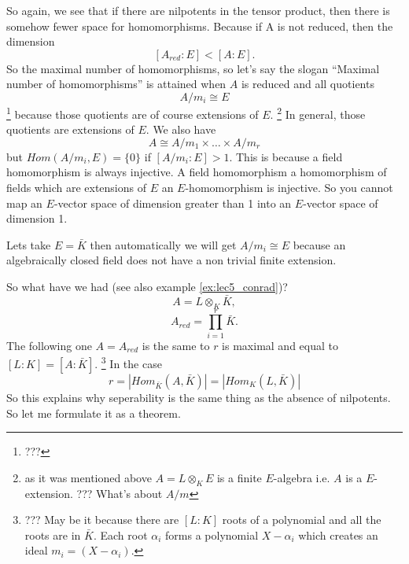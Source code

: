 So again, we see that if there are nilpotents in the tensor product,
then there is somehow fewer space for homomorphisms. Because if A is
not reduced, then the dimension
\[
\left[A_{red} : E\right] < \left[A : E\right].
\]
So the maximal number of homomorphisms, so let's say the slogan
``Maximal number of homomorphisms'' is attained when $A$ is reduced
and all quotients
\begin{equation}
  A/m_i \cong E
  \label{eq:lec5_1}
\end{equation}
\footnote{
  ???
}
because those quotients are of
course extensions of $E$.
\footnote{
  as it was mentioned above $A = L \otimes_K E$ is a finite
  $E$-algebra i.e. $A$ is a $E$-extension. ??? What's about $A/m$
}
In general,    
those quotients are extensions of $E$. We also have
\[
A \cong A/m_1 \times \dots \times A/m_r
\]
but $Hom\left(A/m_i, E\right) = \{0\}$ if $\left[A/m_i: E\right] > 1$.  
This is because a field homomorphism is always injective. A field
homomorphism a homomorphism of fields which are extensions of $E$  an
$E$-homomorphism is injective. So you cannot map an $E$-vector space of
dimension greater than 1 into an $E$-vector space of dimension 1.

Lets take $E = \bar{K}$ then automatically we will get
$A/m_i \cong E$ because an algebraically closed field does not have a
non trivial finite extension.

So what have we had (see also example \ref{ex:lec5_conrad})?
\[
A = L \otimes_K \bar{K},
\]
\[
A_{red} = \prod_{i=1}^r \bar{K}.
\]
The following one $A = A_{red}$ is the same to $r$ is maximal and
equal to $\left[L:K\right] = \left[A: \bar{K}\right]$.
\footnote{
  ??? May be it because there are $\left[L:K\right]$ roots of a
  polynomial and all the roots are in $\bar{K}$. Each root $\alpha_i$
  forms a polynomial $X - \alpha_i$ which creates an ideal $m_i =
  \left(X - \alpha_i\right)$.
}
In the case
\[
r = \left|Hom_{\bar{K}}\left(A, \bar{K}\right)\right| = 
\left|Hom_K\left(L, \bar{K}\right)\right|
\]
So this explains why seperability is the same thing as the absence of
nilpotents. So let me formulate it as a theorem.

